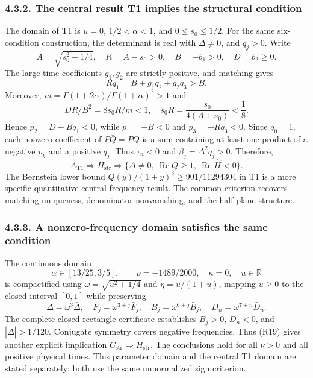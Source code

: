 \documentclass[a4paper,11pt]{article}
\begin{document}
\subsubsection*{4.3.2. The central result T1 implies the structural condition}

The domain of T1 is \(u=0\), \(1/2<\alpha<1\), and \(0\le s_0\le1/2\). For the same six-condition construction, the determinant is real with \(\Delta\ne0\), and \(q_j>0\). Write
\[
A=\sqrt{s_0^2+1/4},\quad R=A-s_0>0,\quad
B=-b_1>0,\quad D=b_2\ge0.
\]
The large-time coefficients \(g_1,g_2\) are strictly positive, and matching gives
\[
Rq_1=B+g_1q_2+g_2q_3>B.
\]
Moreover, \(m=\Gamma(1+2\alpha)/\Gamma(1+\alpha)^2>1\) and
\[
DR/B^2=8s_0R/m<1,
\quad s_0R=\frac{s_0}{4(A+s_0)}<\frac18.
\]
Hence \(p_2=D-Bq_1<0\), while \(p_1=-B<0\) and \(p_3=-Rq_3<0\). Since \(q_0=1\), each nonzero coefficient of \(P\bar Q=PQ\) is a sum containing at least one product of a negative \(p_k\) and a positive \(q_j\). Thus \(\tau_n<0\) and \(\beta_j=\Delta^2q_j>0\). Therefore,
\[
A_{\mathrm{T1}}\Rightarrow H_{\mathrm{str}}
\Rightarrow \{\Delta\ne0,\ \operatorname{Re}Q\ge1,\ \operatorname{Re}\widehat H<0\}.
\tag{R18}
\]
The Bernstein lower bound \(Q(y)/(1+y)^3\ge901/11294304\) in T1 is a more specific quantitative central-frequency result. The common criterion recovers matching uniqueness, denominator nonvanishing, and the half-plane structure.

\subsubsection*{4.3.3. A nonzero-frequency domain satisfies the same condition}

The continuous domain
\[
\alpha\in[13/25,3/5],\qquad
\rho=-1489/2000,\quad\kappa=0,\quad u\in\mathbb R
\tag{R19}
\]
is compactified using \(\omega=\sqrt{u^2+1/4}\) and \(\eta=u/(1+u)\), mapping \(u\ge0\) to the closed interval \([0,1]\) while preserving
\[
\Delta=\omega^3\bar\Delta,\quad F_j=\omega^{3+j}\bar F_j,
\quad B_j=\omega^{6+j}\bar B_j,\quad D_n=\omega^{7+n}\bar D_n.
\]
The complete closed-rectangle certificate establishes \(\bar B_j>0\), \(\bar D_n<0\), and \(|\bar\Delta|>1/120\). Conjugate symmetry covers negative frequencies. Thus (R19) gives another explicit implication \(C_{\mathrm{str}}\Rightarrow H_{\mathrm{str}}\). The conclusions hold for all \(\nu>0\) and all positive physical times. This parameter domain and the central T1 domain are stated separately; both use the same unnormalized sign criterion.
\end{document}

